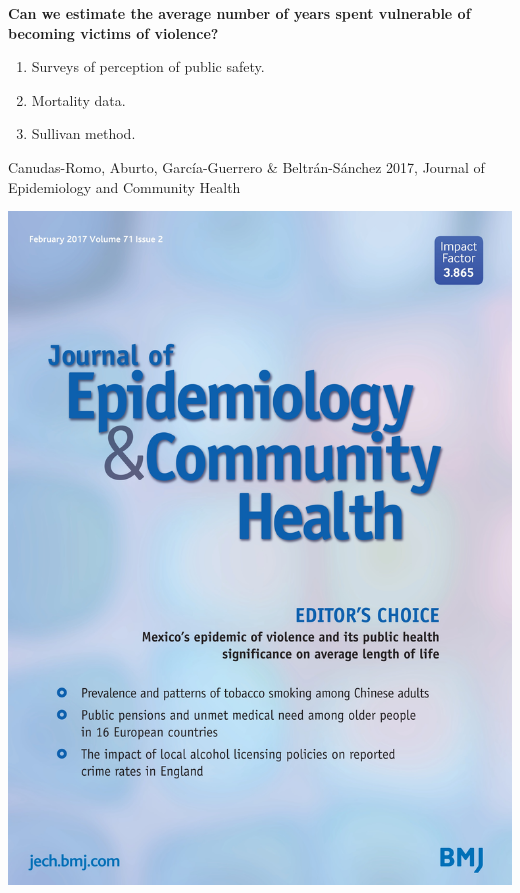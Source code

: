 \documentclass[xcolor={dvipsnames}]{beamer}
\begin{document}
\begin{frame}
	\LARGE{
		\begin{center}	
		\textbf{Can we estimate the average number of years spent vulnerable of becoming victims of violence?}
		\end{center} 
		
		\pause
		
		\begin{enumerate}
		
		\item Surveys of perception of public safety.

		\item Mortality data.
		
		\item Sullivan method.
		
						
		\end{enumerate}
	
		}
		\tiny{Canudas-Romo, Aburto, Garc\'ia-Guerrero \& Beltr\'an-S\'anchez 2017, Journal of Epidemiology and Community Health}
\end{frame}

\begin{frame}
	
	\begin{center}
		\includegraphics[scale=.32]{Figures/JECH}
	\end{center}

\end{frame}
\end{document}
